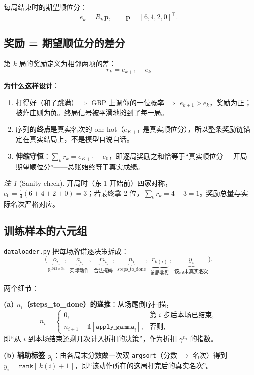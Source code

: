 \documentclass[11pt,a4paper]{ctexart}
\newcommand{\R}{\mathbb{R}}
\theoremstyle{remark}
\newtheorem*{rem}{注}
\begin{document}
每局结束时的期望顺位分：
\[
e_k = R_k^{\top} \bm{p}, \qquad \bm{p} = [6,4,2,0]^{\top}.
\]

\subsection{奖励 = 期望顺位分的差分}

第 $k$ 局的奖励定义为相邻两项的差：
\[
\boxed{\;r_k = e_{k+1} - e_k\;}
\]

\textbf{为什么这样设计}：
\begin{enumerate}[leftmargin=2em, label=(\arabic*)]
  \item 打得好（和了跳满）$\Rightarrow$ GRP 上调你的一位概率 $\Rightarrow$ $e_{k+1} > e_k$，奖励为正；被炸庄则为负。终局信号被平滑地摊到了每一局。
  \item 序列的\textbf{终点}是真实名次的 one-hot（$e_{K+1}$ 是真实顺位分），所以整条奖励链锚定在真实结局上，不是模型自说自话。
  \item \textbf{伸缩守恒}：$\sum_k r_k = e_{K+1} - e_0$，即逐局奖励之和恰等于``真实顺位分 $-$ 开局期望顺位分''——总账始终等于真实成绩。
\end{enumerate}

\begin{rem}[Sanity check]
开局时（东 1 开始前）四家对称，$e_0 = \frac{1}{4}(6+4+2+0) = 3$；若最终拿 2 位，$\sum_k r_k = 4 - 3 = 1$。奖励总量与实际名次严格对应。
\end{rem}

\subsection{训练样本的六元组}

\texttt{dataloader.py} 把每场牌谱逐决策拆成：
\[
\big(\underbrace{o_i}_{\R^{1012\times 34}},\ \underbrace{a_i}_{\text{实际动作}},\ \underbrace{m_i}_{\text{合法掩码}},\ \underbrace{n_i}_{\text{steps\_to\_done}},\ \underbrace{r_{k(i)}}_{\text{该局奖励}},\ \underbrace{y_i}_{\text{该局末真实名次}}\big).
\]

两个细节：

\textbf{(a) $n_i$（steps\_to\_done）的递推}：从场尾倒序扫描，
\[
n_i = \begin{cases} 0, & \text{第 } i \text{ 步后本场已结束},\\[2pt] n_{i+1} + \mathbb{1}[\texttt{apply\_gamma}_i], & \text{否则},\end{cases}
\]
即``从 $i$ 到本场结束还剩几次计入折扣的决策''，作为折扣 $\gamma^{n_i}$ 的指数。

\textbf{(b) 辅助标签 $y_i$}：由各局末分数做一次双 \texttt{argsort}（分数 $\to$ 名次）得到 $y_i = \texttt{rank}[\,k(i)+1\,]$，即``该动作所在的这局打完后的真实名次''。
\end{document}
